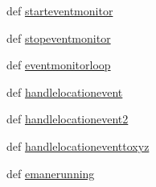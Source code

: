 \begin{DoxyCompactItemize}
def \hyperlink{classcore_1_1emane_1_1emane_1_1_emane_a263e058c6b4275f6ddf2da12d3b3918c}{starteventmonitor}
\item 
def \hyperlink{classcore_1_1emane_1_1emane_1_1_emane_a2419364c42a76dbdebc328ade31c60ca}{stopeventmonitor}
\item 
def \hyperlink{classcore_1_1emane_1_1emane_1_1_emane_a62cf5f05ad9eefc574793a230b8eaa0e}{eventmonitorloop}
\item 
def \hyperlink{classcore_1_1emane_1_1emane_1_1_emane_a0d61d7ecf68e1f7b4d7f4dadea074ecd}{handlelocationevent}
\item 
def \hyperlink{classcore_1_1emane_1_1emane_1_1_emane_aab647851f30e575de2071f3bdaff4e54}{handlelocationevent2}
\item 
def \hyperlink{classcore_1_1emane_1_1emane_1_1_emane_a0a2d9e730bab7c70a87b9a77e5b33ce7}{handlelocationeventtoxyz}
\item 
def \hyperlink{classcore_1_1emane_1_1emane_1_1_emane_a182fdde7a0f3ef5c808c6f72c269adb1}{emanerunning}
\end{DoxyCompactItemize}
